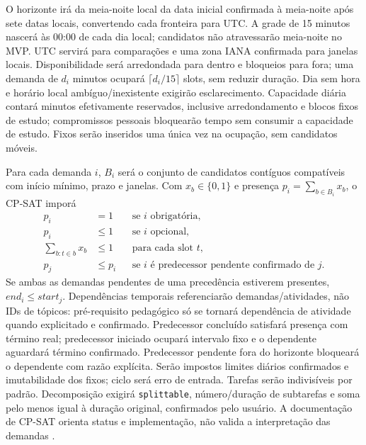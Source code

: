 \documentclass[12pt]{article}
\let\cite\citep
\newcommand{\code}[1]{\nolinkurl{#1}}
\begin{document}
O horizonte irá da meia-noite local da data inicial confirmada à meia-noite após sete datas locais, convertendo cada fronteira para UTC. A grade de 15 minutos nascerá às 00:00 de cada dia local; candidatos não atravessarão meia-noite no MVP. UTC servirá para comparações e uma zona IANA confirmada para janelas locais. Disponibilidade será arredondada para dentro e bloqueios para fora; uma demanda de $d_i$ minutos ocupará $\lceil d_i/15\rceil$ slots, sem reduzir duração. Dia sem hora e horário local ambíguo/inexistente exigirão esclarecimento. Capacidade diária contará minutos efetivamente reservados, inclusive arredondamento e blocos fixos de estudo; compromissos pessoais bloquearão tempo sem consumir a capacidade de estudo. Fixos serão inseridos uma única vez na ocupação, sem candidatos móveis.

Para cada demanda $i$, $B_i$ será o conjunto de candidatos contíguos compatíveis com início mínimo, prazo e janelas. Com $x_b\in\{0,1\}$ e presença $p_i=\sum_{b\in B_i}x_b$, o CP-SAT imporá
\begin{align}
 p_i&=1 &&\text{se $i$ obrigatória},\\
 p_i&\leq1 &&\text{se $i$ opcional},\\
 \sum_{b:t\in b}x_b&\leq1 &&\text{para cada slot $t$},\\
 p_j&\leq p_i &&\text{se $i$ é predecessor pendente confirmado de $j$}.
\end{align}
Se ambas as demandas pendentes de uma precedência estiverem presentes, $end_i\leq start_j$. Dependências temporais referenciarão demandas/atividades, não IDs de tópicos: pré-requisito pedagógico só se tornará dependência de atividade quando explicitado e confirmado. Predecessor concluído satisfará presença com término real; predecessor iniciado ocupará intervalo fixo e o dependente aguardará término confirmado. Predecessor pendente fora do horizonte bloqueará o dependente com razão explícita. Serão impostos limites diários confirmados e imutabilidade dos fixos; ciclo será erro de entrada. Tarefas serão indivisíveis por padrão. Decomposição exigirá \code{splittable}, número/duração de subtarefas e soma pelo menos igual à duração original, confirmados pelo usuário. A documentação de CP-SAT orienta status e implementação, não valida a interpretação das demandas \cite{google2024cpsat}.
\end{document}
